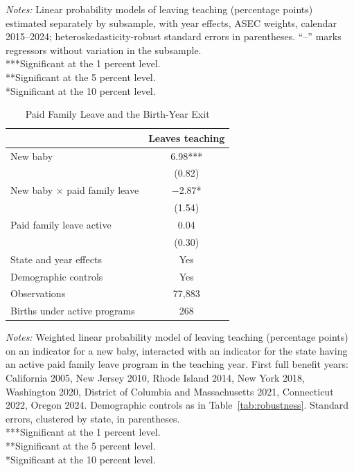 \documentclass[11pt,a4paper]{article}
\newcommand{\fignote}[1]{\par\vspace{4pt}%
  \begin{minipage}{\linewidth}\footnotesize\color{ecgray}#1\end{minipage}}
\newcommand{\starlegend}{\\[2pt]
\hspace*{0pt}***Significant at the 1 percent level.\\
\hspace*{0pt}\phantom{*}**Significant at the 5 percent level.\\
\hspace*{0pt}\phantom{**}*Significant at the 10 percent level.}
\begin{document}
\begin{table}[h]
\centering\footnotesize
\caption{The Attrition Model in Subsamples}
\label{tab:subsamples}

\fignote{\textit{Notes:} Linear probability models of leaving teaching
(percentage points) estimated separately by subsample, with year
effects, ASEC weights, calendar 2015--2024;
heteroskedasticity-robust standard errors in parentheses. ``--'' marks
regressors without variation in the subsample.\starlegend}
\end{table}

\begin{table}[h]
\centering\small
\caption{Paid Family Leave and the Birth-Year Exit}
\label{tab:pfl}
\begin{tabular}{lc}
\toprule
 & Leaves teaching \\
\midrule
New baby & 6.98*** \\
 & (0.82) \\
New baby $\times$ paid family leave & $-$2.87* \\
 & (1.54) \\
Paid family leave active & 0.04 \\
 & (0.30) \\
\midrule
State and year effects & Yes \\
Demographic controls & Yes \\
Observations & 77,883 \\
Births under active programs & 268 \\
\bottomrule
\end{tabular}
\fignote{\textit{Notes:} Weighted linear probability model of leaving
teaching (percentage points) on an indicator for a new baby,
interacted with an indicator for the state having an active paid
family leave program in the teaching year. First full benefit years:
California 2005, New Jersey 2010, Rhode Island 2014, New York 2018,
Washington 2020, District of Columbia and Massachusetts 2021,
Connecticut 2022, Oregon 2024. Demographic controls as in
Table~\ref{tab:robustness}. Standard errors, clustered by state, in
parentheses.\starlegend}
\end{table}
\end{document}
